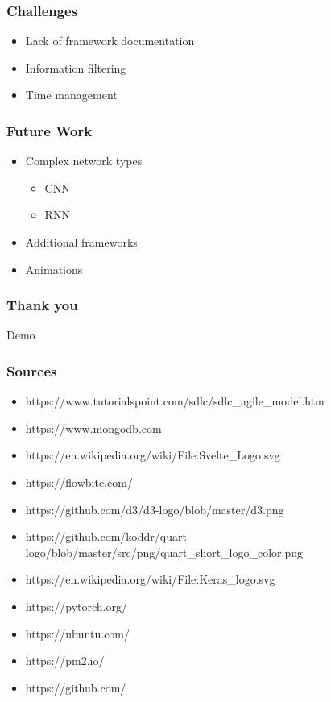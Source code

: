 \documentclass{beamer}
\begin{document}
\begin{frame}
    \frametitle{Challenges}
    \begin{itemize}
        \item Lack of framework documentation \pause
        \item Information filtering \pause
        \item Time management
    \end{itemize}
\end{frame}

\begin{frame}
    \frametitle{Future Work}
    \begin{itemize}
        \item Complex network types 
            \begin{itemize}
                \item CNN
                \item RNN
            \end{itemize} \pause
        \item Additional frameworks \pause
        \item Animations
    \end{itemize}
\end{frame}

\begin{frame}
    \frametitle{Thank you}
    Demo
    \centering
\end{frame}

\begin{frame}
    \frametitle{Sources}
    \begin{itemize}
        \item https://www.tutorialspoint.com/sdlc/sdlc\_agile\_model.htm
        \item https://www.mongodb.com
        \item https://en.wikipedia.org/wiki/File:Svelte\_Logo.svg
        \item https://flowbite.com/
        \item https://github.com/d3/d3-logo/blob/master/d3.png
        \item https://github.com/koddr/quart-logo/blob/master/src/png/quart\_short\_logo\_color.png
        \item https://en.wikipedia.org/wiki/File:Keras\_logo.svg
        \item https://pytorch.org/
        \item https://ubuntu.com/
        \item https://pm2.io/
        \item https://github.com/
    \end{itemize}
    \centering
\end{frame}
\end{document}
